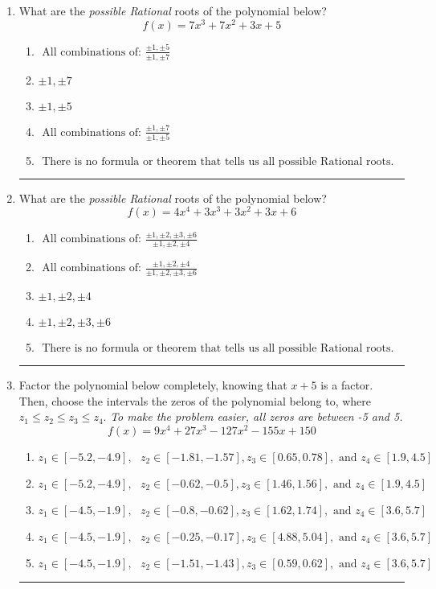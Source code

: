 \documentclass[14pt]{extbook}
\newcommand{\litem}[1]{\item#1\hspace*{-1cm}\rule{\textwidth}{0.4pt}}
\begin{document}
\begin{enumerate}
\litem{
What are the \textit{possible Rational} roots of the polynomial below?\[ f(x) = 7x^{3} +7 x^{2} +3 x + 5 \]\begin{enumerate}[label=\Alph*.]
\item \( \text{ All combinations of: }\frac{\pm 1,\pm 5}{\pm 1,\pm 7} \)
\item \( \pm 1,\pm 7 \)
\item \( \pm 1,\pm 5 \)
\item \( \text{ All combinations of: }\frac{\pm 1,\pm 7}{\pm 1,\pm 5} \)
\item \( \text{ There is no formula or theorem that tells us all possible Rational roots.} \)

\end{enumerate} }
\litem{
What are the \textit{possible Rational} roots of the polynomial below?\[ f(x) = 4x^{4} +3 x^{3} +3 x^{2} +3 x + 6 \]\begin{enumerate}[label=\Alph*.]
\item \( \text{ All combinations of: }\frac{\pm 1,\pm 2,\pm 3,\pm 6}{\pm 1,\pm 2,\pm 4} \)
\item \( \text{ All combinations of: }\frac{\pm 1,\pm 2,\pm 4}{\pm 1,\pm 2,\pm 3,\pm 6} \)
\item \( \pm 1,\pm 2,\pm 4 \)
\item \( \pm 1,\pm 2,\pm 3,\pm 6 \)
\item \( \text{ There is no formula or theorem that tells us all possible Rational roots.} \)

\end{enumerate} }
\litem{
Factor the polynomial below completely, knowing that $x + 5$ is a factor. Then, choose the intervals the zeros of the polynomial belong to, where $z_1 \leq z_2 \leq z_3 \leq z_4$. \textit{To make the problem easier, all zeros are between -5 and 5.}\[ f(x) = 9x^{4} +27 x^{3} -127 x^{2} -155 x + 150 \]\begin{enumerate}[label=\Alph*.]
\item \( z_1 \in [-5.2, -4.9], \text{   }  z_2 \in [-1.81, -1.57], z_3 \in [0.65, 0.78], \text{   and   } z_4 \in [1.9, 4.5] \)
\item \( z_1 \in [-5.2, -4.9], \text{   }  z_2 \in [-0.62, -0.5], z_3 \in [1.46, 1.56], \text{   and   } z_4 \in [1.9, 4.5] \)
\item \( z_1 \in [-4.5, -1.9], \text{   }  z_2 \in [-0.8, -0.62], z_3 \in [1.62, 1.74], \text{   and   } z_4 \in [3.6, 5.7] \)
\item \( z_1 \in [-4.5, -1.9], \text{   }  z_2 \in [-0.25, -0.17], z_3 \in [4.88, 5.04], \text{   and   } z_4 \in [3.6, 5.7] \)
\item \( z_1 \in [-4.5, -1.9], \text{   }  z_2 \in [-1.51, -1.43], z_3 \in [0.59, 0.62], \text{   and   } z_4 \in [3.6, 5.7] \)


\end{enumerate}}
\end{enumerate}
\end{document}
